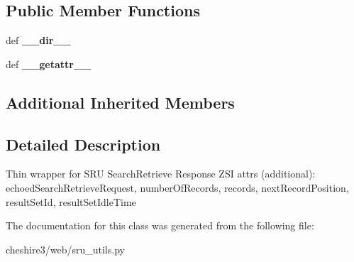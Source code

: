 \subsection*{Public Member Functions}
\begin{DoxyCompactItemize}
\item 
\hypertarget{classcheshire3_1_1web_1_1sru__utils_1_1_search_retrieve_response_a4ff55907b78787846b7d4d4448dd240a}{def {\bfseries \-\_\-\-\_\-dir\-\_\-\-\_\-}}\label{classcheshire3_1_1web_1_1sru__utils_1_1_search_retrieve_response_a4ff55907b78787846b7d4d4448dd240a}

\item 
\hypertarget{classcheshire3_1_1web_1_1sru__utils_1_1_search_retrieve_response_a8f1c936f43b6733bb521aeecc3ae0a96}{def {\bfseries \-\_\-\-\_\-getattr\-\_\-\-\_\-}}\label{classcheshire3_1_1web_1_1sru__utils_1_1_search_retrieve_response_a8f1c936f43b6733bb521aeecc3ae0a96}

\end{DoxyCompactItemize}
\subsection*{Additional Inherited Members}


\subsection{Detailed Description}
\begin{DoxyVerb}Thin wrapper for SRU SearchRetrieve Response
ZSI attrs (additional): echoedSearchRetrieveRequest, numberOfRecords, records, nextRecordPosition, resultSetId, resultSetIdleTime
\end{DoxyVerb}
 

The documentation for this class was generated from the following file\-:\begin{DoxyCompactItemize}
\item 
cheshire3/web/sru\-\_\-utils.\-py\end{DoxyCompactItemize}
